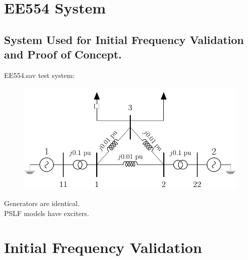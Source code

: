 \documentclass[14pt, unknownkeysallowed]{beamer}
\begin{document}
\section{EE554 System}
\subsection{System Used for Initial Frequency Validation and Proof of Concept.}
\begin{frame}
EE554.sav test system:
\vspace{-1em}\\
\begin{figure}
	\includegraphics[width=\linewidth]{cicuitEE554}
\end{figure}
\vspace{-1em}
Generators are identical. \\PSLF models have exciters.
\end{frame}

\section{Initial Frequency Validation}
\end{document}
